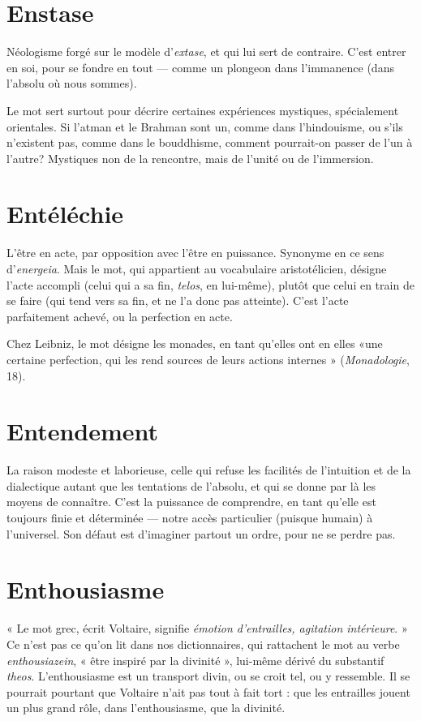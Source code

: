 \section{Enstase}
Néologisme forgé sur le modèle d’{\it extase}, et qui lui sert de contraire.
C’est entrer en soi, pour se fondre en tout — comme un plongeon
dans l’immanence (dans l’absolu où nous sommes).

Le mot sert surtout pour décrire certaines expériences mystiques, spécialement
orientales. Si l’atman et le Brahman sont un, comme dans l’hindouisme,
ou s’ils n'existent pas, comme dans le bouddhisme, comment pourrait-on
passer de l’un à l’autre? Mystiques non de la rencontre, mais de
l'unité ou de l’immersion.

\section{Entéléchie}
L'être en acte, par opposition avec l'être en puissance. Synonyme
en ce sens d’{\it energeia}. Mais le mot, qui appartient au
vocabulaire aristotélicien, désigne l’acte accompli (celui qui a sa fin, {\it telos}, en
lui-même), plutôt que celui en train de se faire (qui tend vers sa fin, et ne l’a
donc pas atteinte). C’est l’acte parfaitement achevé, ou la perfection en acte.

Chez Leibniz, le mot désigne les monades, en tant qu’elles ont en elles
«une certaine perfection, qui les rend sources de leurs actions internes »
({\it Monadologie}, 18).

\section{Entendement}
La raison modeste et laborieuse, celle qui refuse les facilités
de l’intuition et de la dialectique autant que les tentations
de l’absolu, et qui se donne par là les moyens de connaître. C’est la puissance
de comprendre, en tant qu’elle est toujours finie et déterminée — notre
accès particulier (puisque humain) à l’universel. Son défaut est d'imaginer partout
un ordre, pour ne se perdre pas.

\section{Enthousiasme}
« Le mot grec, écrit Voltaire, signifie {\it émotion d'entrailles,
agitation intérieure}. » Ce n’est pas ce qu’on lit
dans nos dictionnaires, qui rattachent le mot au verbe {\it enthousiazein}, « être inspiré
par la divinité », lui-même dérivé du substantif {\it theos}. L’enthousiasme est
un transport divin, ou se croit tel, ou y ressemble. Il se pourrait pourtant que
Voltaire n’ait pas tout à fait tort : que les entrailles jouent un plus grand rôle,
dans l’enthousiasme, que la divinité.

